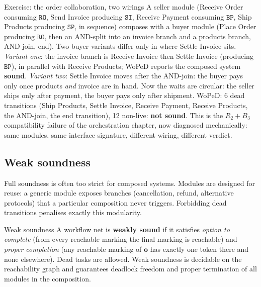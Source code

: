 \begin{examplebox}{Exercise: the order collaboration, two wirings}
A seller module (\textsf{Receive Order} consuming $\mathtt{RO}$, \textsf{Send Invoice} producing $\mathtt{SI}$, \textsf{Receive Payment} consuming $\mathtt{BP}$, \textsf{Ship Products} producing $\mathtt{SP}$, in sequence) composes with a buyer module (\textsf{Place Order} producing $\mathtt{RO}$, then an AND-split into an invoice branch and a products branch, AND-join, end). Two buyer variants differ only in where \textsf{Settle Invoice} sits. \emph{Variant one}: the invoice branch is \textsf{Receive Invoice} then \textsf{Settle Invoice} (producing $\mathtt{BP}$), in parallel with \textsf{Receive Products}; WoPeD reports the composed system \textbf{sound}. \emph{Variant two}: \textsf{Settle Invoice} moves after the AND-join: the buyer pays only once products \emph{and} invoice are in hand. Now the waits are circular: the seller ships only after payment, the buyer pays only after shipment. WoPeD: 6 dead transitions (\textsf{Ship Products}, \textsf{Settle Invoice}, \textsf{Receive Payment}, \textsf{Receive Products}, the AND-join, the end transition), 12 non-live: \textbf{not sound}. This is the $R_2 + B_3$ compatibility failure of the orchestration chapter, now diagnosed mechanically: same modules, same interface signature, different wiring, different verdict.
\end{examplebox}

\subsection{Weak soundness}

Full soundness is often too strict for composed systems. Modules are designed for reuse: a generic module exposes branches (cancellation, refund, alternative protocols) that a particular composition never triggers. Forbidding dead transitions penalises exactly this modularity.
\begin{definitionbox}{Weak soundness}
A workflow net is \textbf{weakly sound} if it satisfies \emph{option to complete} (from every reachable marking the final marking is reachable) and \emph{proper completion} (any reachable marking of $\mathbf{o}$ has exactly one token there and none elsewhere). Dead tasks are allowed. Weak soundness is decidable on the reachability graph and guarantees deadlock freedom and proper termination of all modules in the composition.
\end{definitionbox}

